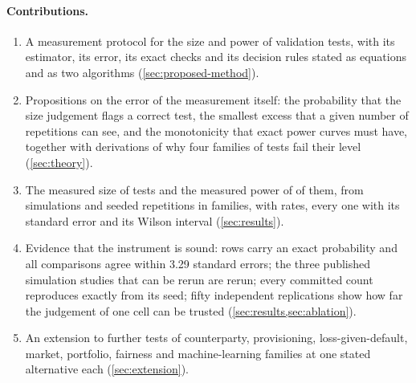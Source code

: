 \paragraph{Contributions.}
\begin{enumerate}
\item A measurement protocol for the size and power of validation tests, with its estimator, its error, its exact checks and its decision rules stated as equations and as two algorithms (\cref{sec:proposed-method}).
\item Propositions on the error of the measurement itself: the probability that the size judgement flags a correct test, the smallest excess that a given number of repetitions can see, and the monotonicity that exact power curves must have, together with derivations of why four families of tests fail their level (\cref{sec:theory}).
\item The measured size of \nTests{} tests and the measured power of \nPowerTests{} of them, from \nSims{} simulations and \nReps{} seeded repetitions in \nFamilies{} families, with \nRates{} rates, every one with its standard error and its Wilson interval (\cref{sec:results}).
\item Evidence that the instrument is sound: \nExactRows{} rows carry an exact probability and all \nAgree{} comparisons agree within 3.29 standard errors; the three published simulation studies that can be rerun are rerun; every committed count reproduces exactly from its seed; fifty independent replications show how far the judgement of one cell can be trusted (\cref{sec:results,sec:ablation}).
\item An extension to \nExtTests{} further tests of counterparty, provisioning, loss-given-default, market, portfolio, fairness and machine-learning families at one stated alternative each (\cref{sec:extension}).
\end{enumerate}

